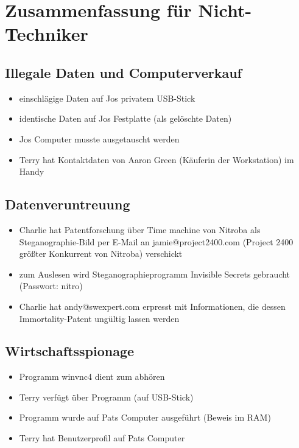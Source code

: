 \chapter{Zusammenfassung für Nicht-Techniker}
\label{sec:nicht_tec}

\section{Illegale Daten und Computerverkauf}
\label{sec:illegale_daten}
\begin{itemize}
	\item einschlägige Daten auf Jos privatem USB-Stick
	\item identische Daten auf Jos Festplatte (als gelöschte Daten)
	\item Jos Computer musste ausgetauscht werden
	\item Terry hat Kontaktdaten von Aaron Green (Käuferin der Workstation) im Handy
\end{itemize}

\section{Datenveruntreuung}
\label{sec:veruntreuung}
\begin{itemize}
	\item Charlie hat Patentforschung über Time machine von Nitroba als Steganographie-Bild per E-Mail an jamie@project2400.com (Project 2400 größter Konkurrent von Nitroba) verschickt
	\item zum Auslesen wird Steganographieprogramm Invisible Secrets gebraucht (Passwort: nitro)
	\item Charlie hat andy@swexpert.com erpresst mit Informationen, die dessen Immortality-Patent ungültig lassen werden
\end{itemize}

\section{Wirtschaftsspionage}
\label{sec:spionage}
\begin{itemize}
	\item Programm winvnc4 dient zum abhören
	\item Terry verfügt über Programm (auf USB-Stick)
	\item Programm wurde auf Pats Computer ausgeführt (Beweis im RAM)
	\item Terry hat Benutzerprofil auf Pats Computer
\end{itemize}
